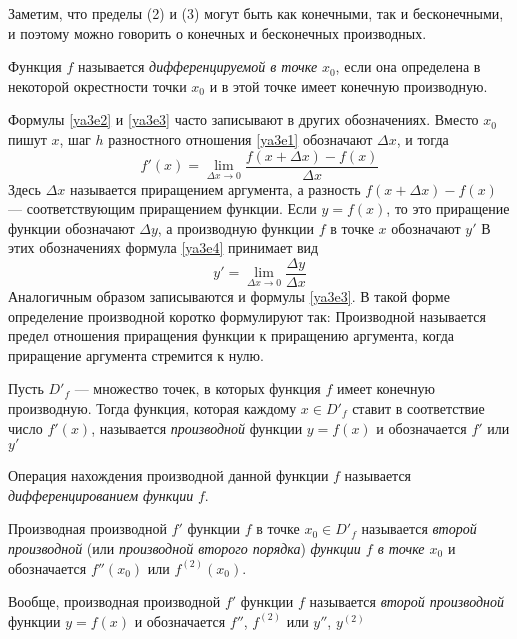 Заметим, что пределы (2) и (3) могут быть как конечными, так и бесконечными, и поэтому можно говорить о конечных и бесконечных производных. 
\begin{defn} Функция $f$ называется \textit{дифференцируемой в точке} $x_0$, если она определена в некоторой окрестности точки $x_0$ и в этой точке имеет конечную производную.
\end{defn}
Формулы \eqref{ya3e2} и \eqref{ya3e3} часто записывают в других обозначениях. Вместо $x_0$ пишут $x$, шаг $h$ разностного отношения \eqref{ya3e1} обозначают $\Delta x$, и тогда	
\begin{equation}\label{ya3e4}
f'(x)=\lim_{\Delta x\to 0}\limits\frac{f(x+\Delta x)-f(x)}{\Delta x}
\end{equation}
Здесь $\Delta x$ называется приращением аргумента, а разность $f(x+\Delta x)-f(x)$ --- соответствующим приращением функции. Если $y = f(x)$, то это приращение функции обозначают $\Delta y$, а производную функции $f$ в точке $x$ обозначают $y'$ В этих обозначениях формула \eqref{ya3e4} принимает вид
$$
y'=\lim_{\Delta x \to 0}\limits \frac{\Delta y}{\Delta x}
$$
Аналогичным образом записываются и формулы \eqref{ya3e3}. В такой форме определение производной коротко формулируют так:
Производной называется предел отношения приращения функции к приращению аргумента, когда приращение аргумента стремится к нулю.	

\begin{defn}
Пусть $D'_f$ --- множество точек, в которых функция $f$ имеет конечную производную. Тогда функция, которая каждому $x \in D'_f$ ставит в соответствие число $f'(x)$, называется \textit{производной} функции $y=f(x)$ и обозначается $f'$ или $y'$
\end{defn}
Операция нахождения производной данной функции $f$ называется \textit{дифференцированием функции} $f$.


\begin{defn}
Производная производной $f'$ функции $f$ в точке $x_0 \in D'_f$ называется \textit{второй производной} (или \textit{производной второго порядка}) \textit{функции $f$ в точке $x_0$} и обозначается $f''(x_0)$ или $f^{(2)}(x_0)$.
\end{defn}
Вообще, производная производной $f'$ функции $f$ называется \textit{второй производной} функции $y=f(x)$ и обозначается $f''$, $f^{(2)}$ или $y''$, $y^{(2)}$

